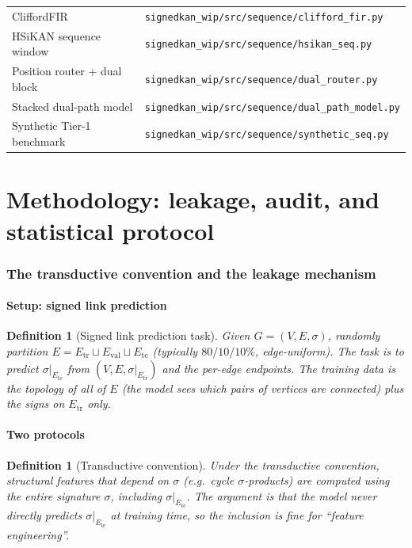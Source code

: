 \documentclass[11pt,a4paper]{article}
\newtheorem{definition}[theorem]{Definition}
\theoremstyle{remark}
\begin{document}
\begin{tabular}{ll}
CliffordFIR & \texttt{signedkan\_wip/src/sequence/clifford\_fir.py} \\
HSiKAN sequence window & \texttt{signedkan\_wip/src/sequence/hsikan\_seq.py} \\
Position router + dual block & \texttt{signedkan\_wip/src/sequence/dual\_router.py} \\
Stacked dual-path model & \texttt{signedkan\_wip/src/sequence/dual\_path\_model.py} \\
Synthetic Tier-1 benchmark & \texttt{signedkan\_wip/src/sequence/synthetic\_seq.py} \\
\end{tabular}

\bigskip
\part{Methodology: leakage, audit, and statistical protocol}

\section{The transductive convention and the leakage mechanism}\label{sec:leakage}

\subsection{Setup: signed link prediction}

\begin{definition}[Signed link prediction task]
Given $G = (V, E, \sigma)$, randomly partition $E = E_{\text{tr}}
\sqcup E_{\text{val}} \sqcup E_{\text{te}}$ (typically
$80/10/10\%$, edge-uniform). The task is to predict
$\sigma|_{E_{\text{te}}}$ from
$(V, E, \sigma|_{E_{\text{tr}}})$ and the per-edge endpoints.
The training data is the topology of all of $E$ (the model sees
which pairs of vertices are connected) plus the signs on
$E_{\text{tr}}$ only.
\end{definition}

\subsection{Two protocols}

\begin{definition}[Transductive convention]
Under the \emph{transductive convention}, structural features that
depend on $\sigma$ (e.g.\ cycle $\sigma$-products) are computed
using the \emph{entire} signature $\sigma$, including
$\sigma|_{E_{\text{te}}}$. The argument is that the model never
directly predicts $\sigma|_{E_{\text{te}}}$ at training time, so
the inclusion is fine for ``feature engineering''.
\end{definition}
\end{document}
